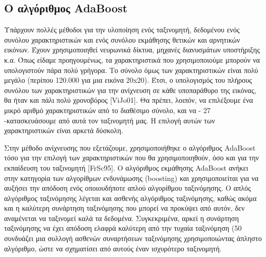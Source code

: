 \subsection{Ο αλγόριθμος AdaBoost}

Υπάρχουν πολλές μέθοδοι για την υλοποίηση ενός ταξινομητή, δεδομένου ενός συνόλου
χαρακτηριστικών και ενός συνόλου εκμάθησης θετικών και αρνητικών εικόνων. Έχουν
χρησιμοποιηθεί νευρωνικά δίκτυα, μηχανές διανυσμάτων υποστήριξης κ.α. Όπως είδαμε
προηγουμένως, τα χαρακτηριστικά που χρησιμοποιούμε μπορούν να υπολογιστούν πάρα πολύ
γρήγορα. Το σύνολο όμως των χαρακτηριστικών είναι πολύ μεγάλο (περίπου 120.000 για μια
εικόνα 20x20). Έτσι, ο υπολογισμός του πλήρους συνόλου των χαρακτηριστικών για την ανίχνευση
σε κάθε υποπαράθυρο της εικόνας, θα ήταν και πάλι πολύ χρονοβόρος [ViJo01]. Θα πρέπει,
λοιπόν, να επιλέξουμε ένα μικρό αριθμό χαρακτηριστικών από το διαθέσιμο σύνολο, και να
- 27 -κατασκευάσουμε από αυτά τον ταξινομητή μας. Η επιλογή αυτών των χαρακτηριστικών είναι
αρκετά δύσκολη.

Στην μέθοδο ανίχνευσης που εξετάζουμε, χρησιμοποιήθηκε ο αλγόριθμος AdaBoost τόσο για
την επιλογή των χαρακτηριστικών που θα χρησιμοποιηθούν, όσο και για την εκπαίδευση του
ταξινομητή [FrSc95]. Ο αλγόριθμος εκμάθησης AdaBoost ανήκει στην κατηγορία των
αλγορίθμων ενδυνάμωσης (boosting) και χρησιμοποιείται για να αυξήσει την απόδοση ενός
οποιουδήποτε απλού αλγορίθμου ταξινόμησης. Ο απλός αλγόριθμος ταξινόμησης λέγεται και
ασθενής αλγόριθμος ταξινόμησης, καθώς ακόμα και η καλύτερη συνάρτηση ταξινόμησης που
μπορεί να προκύψει από αυτόν, δεν αναμένεται να ταξινομεί καλά τα δεδομένα. Συγκεκριμένα,
αρκεί η συνάρτηση ταξινόμησης να έχει απόδοση ελαφρά καλύτερη από την τυχαία ταξινόμηση
(50%
συνδυάζει μια συλλογή ασθενών συναρτήσεων ταξινόμησης χρησιμοποιώντας άπληστο αλγόριθμο,
ώστε να σχηματίσει από αυτούς έναν ισχυρότερο ταξινομητή.

